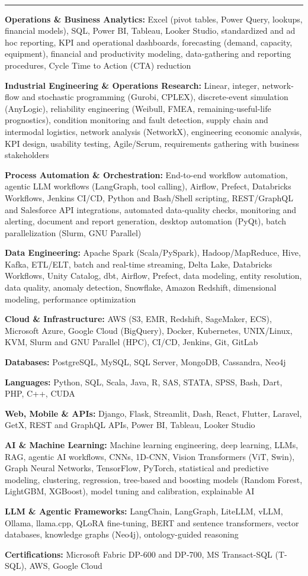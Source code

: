 \documentclass[10pt,a4paper]{extarticle}
\newcommand{\sect}[2][]{\needspace{45pt}\vspace{9pt}%
  {\color{navy}\bfseries\large\textls[60]{\MakeUppercase{#2}}}{\color{muted}\small\ #1}\\[-6.5pt]
  {\color{navy}\rule{\linewidth}{0.5pt}}\par\vspace{-1pt}}
\newcommand{\skill}[2]{\noindent\textbf{#1:} #2\par\vspace{2pt}}
\begin{document}
\sect{Technical Skills}
\skill{Operations \& Business Analytics}{Excel (pivot tables, Power Query, lookups, financial models), SQL, Power BI, Tableau, Looker Studio, standardized and ad hoc reporting, KPI and operational dashboards, forecasting (demand, capacity, equipment), financial and productivity modeling, data-gathering and reporting procedures, Cycle Time to Action (CTA) reduction}
\skill{Industrial Engineering \& Operations Research}{Linear, integer, network-flow and stochastic programming (Gurobi, CPLEX), discrete-event simulation (AnyLogic), reliability engineering (Weibull, FMEA, remaining-useful-life prognostics), condition monitoring and fault detection, supply chain and intermodal logistics, network analysis (NetworkX), engineering economic analysis, KPI design, usability testing, Agile/Scrum, requirements gathering with business stakeholders}
\skill{Process Automation \& Orchestration}{End-to-end workflow automation, agentic LLM workflows (LangGraph, tool calling), Airflow, Prefect, Databricks Workflows, Jenkins CI/CD, Python and Bash/Shell scripting, REST/GraphQL and Salesforce API integrations, automated data-quality checks, monitoring and alerting, document and report generation, desktop automation (PyQt), batch parallelization (Slurm, GNU Parallel)}
\skill{Data Engineering}{Apache Spark (Scala/PySpark), Hadoop/MapReduce, Hive, Kafka, ETL/ELT, batch and real-time streaming, Delta Lake, Databricks Workflows, Unity Catalog, dbt, Airflow, Prefect, data modeling, entity resolution, data quality, anomaly detection, Snowflake, Amazon Redshift, dimensional modeling, performance optimization}
\skill{Cloud \& Infrastructure}{AWS (S3, EMR, Redshift, SageMaker, ECS), Microsoft Azure, Google Cloud (BigQuery), Docker, Kubernetes, UNIX/Linux, KVM, Slurm and GNU Parallel (HPC), CI/CD, Jenkins, Git, GitLab}
\skill{Databases}{PostgreSQL, MySQL, SQL Server, MongoDB, Cassandra, Neo4j}
\skill{Languages}{Python, SQL, Scala, Java, R, SAS, STATA, SPSS, Bash, Dart, PHP, C++, CUDA}
\skill{Web, Mobile \& APIs}{Django, Flask, Streamlit, Dash, React, Flutter, Laravel, GetX, REST and GraphQL APIs, Power BI, Tableau, Looker Studio}
\skill{AI \& Machine Learning}{Machine learning engineering, deep learning, LLMs, RAG, agentic AI workflows, CNNs, 1D-CNN, Vision Transformers (ViT, Swin), Graph Neural Networks, TensorFlow, PyTorch, statistical and predictive modeling, clustering, regression, tree-based and boosting models (Random Forest, LightGBM, XGBoost), model tuning and calibration, explainable AI}
\skill{LLM \& Agentic Frameworks}{LangChain, LangGraph, LiteLLM, vLLM, Ollama, llama.cpp, QLoRA fine-tuning, BERT and sentence transformers, vector databases, knowledge graphs (Neo4j), ontology-guided reasoning}
\skill{Certifications}{Microsoft Fabric DP-600 and DP-700, MS Transact-SQL (T-SQL), AWS, Google Cloud}
\end{document}
